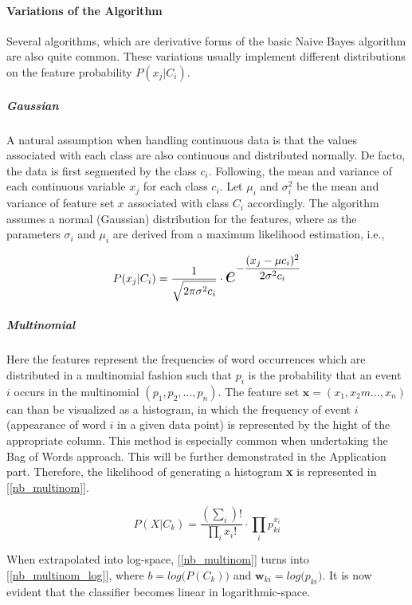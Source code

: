 	\paragraph{Variations of the Algorithm}
		Several algorithms, which are derivative forms of the basic Naive Bayes algorithm are also quite common. These variations usually implement different distributions on the feature probability $ P(x_j|C_i) $.
		
		\subparagraph{Gaussian}
			A natural assumption when handling continuous data is that the values associated with each class are also continuous and distributed normally. De facto, the data is first segmented by the class $ c_i $. Following, the mean and variance of each continuous variable $ x_j $ for each class  $ c_i $. Let $ \mu_i $ and $ \sigma_i^2 $ be the mean and variance of feature set $ x $ associated with class $ C_i $ accordingly. The algorithm assumes a normal (Gaussian) distribution for the features, where as the parameters $ \sigma_i $ and $ \mu_i $ are derived from a maximum likelihood estimation, i.e.,
	
		\begin{equation}
			P(x_j|C_i) = \frac{1}{\sqrt{\vphantom{\frac{1}{1}} 2 \pi \sigma^2 c_i}} \cdot 
			\scaleobj{2}{e}^{ \displaystyle - \frac{(x_j-\mu c_i)^2}{2 \sigma^2 c_i} }
		\end{equation}
	
		\subparagraph{Multinomial}
			Here the features represent the frequencies of word occurrences which are distributed in a multinomial fashion such that $ p_i $ is the probability that an event $ i $ occurs in the multinomial $ (p_1,p_2, ...,p_n) $. The feature set $ \textbf{x} = (x_1,x_2m ...,x_n) $ can than be visualized as a histogram, in which the frequency of event $ i $ (appearance of word $ i $ in a given data point) is represented by the hight of the appropriate column. This method is especially common when undertaking the Bag of Words approach. This will be further demonstrated in the Application part. Therefore, the likelihood of generating a histogram \textbf{x} is represented in [\ref{nb_multinom}].
	
	\begin{equation}
		P(X|C_k) = \frac{(\sum_i)!}{\prod_i x_i !} \cdot \prod_i p_{ki}^{x_i}
		\label{nb_multinom}
	\end{equation}
	
		When extrapolated into log-space, [\ref{nb_multinom}] turns into [\ref{nb_multinom_log}], where $ b = log \big( P(C_k)\big) $ and $ \textbf{w}_{ki} = log \big( p_{ki} \big) $. It is now evident that the classifier becomes linear in logarithmic-space.
	
